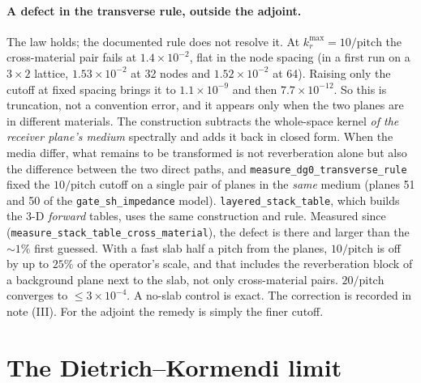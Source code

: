 \documentclass[11pt,a4paper]{article}
\begin{document}
\paragraph{A defect in the transverse rule, outside the adjoint.} The law holds; the documented
rule does not resolve it. At $k_r^{\max} = 10/\text{pitch}$ the cross-material pair fails at
$1.4\times10^{-2}$, flat in the node spacing (in a first run on a $3\times2$ lattice, $1.53\times10^{-2}$ at 32 nodes and $1.52\times10^{-2}$ at 64). Raising
only the cutoff at fixed spacing brings it to $1.1\times10^{-9}$ and then $7.7\times10^{-12}$. So this
is truncation, not a convention error, and it appears only when the two planes are in different
materials. The construction subtracts the whole-space kernel \emph{of the receiver plane's medium}
spectrally and adds it back in closed form. When the media differ, what remains to be transformed
is not reverberation alone but also the difference between the two direct paths, and
\nolinkurl{measure_dg0_transverse_rule} fixed the $10/\text{pitch}$ cutoff on a single pair of
planes in the \emph{same} medium (planes 51 and 50 of the \texttt{gate\_sh\_impedance} model).
\texttt{layered\_stack\_table}, which builds the 3-D \emph{forward} tables, uses the same
construction and rule. Measured since (\nolinkurl{measure_stack_table_cross_material}), the defect
is there and larger than the ${\sim}1\%$ first guessed. With a fast slab half a pitch from the
planes, $10/\text{pitch}$ is off by up to $25\%$ of the operator's scale, and that includes the
reverberation block of a background plane next to the slab, not only cross-material pairs.
$20/\text{pitch}$ converges to ${\le}3\times10^{-4}$. A no-slab control is exact. The correction
is recorded in note (III). For the adjoint the remedy is simply the finer cutoff.

\section{The Dietrich--Kormendi limit}\label{sec:dk}
\end{document}
